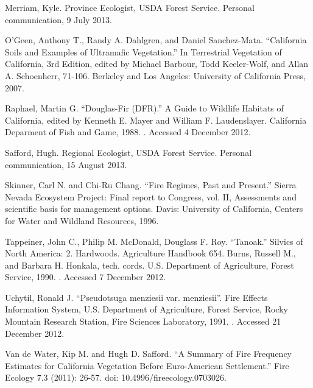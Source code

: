 \begin{hangparas}{.25in}{1}
Merriam, Kyle. Province Ecologist, USDA Forest Service. Personal communication, 9 July 2013.

O’Geen, Anthony T., Randy A. Dahlgren, and Daniel Sanchez-Mata. ``California Soils and Examples of Ultramafic Vegetation.'' In Terrestrial Vegetation of California, 3rd Edition, edited by Michael Barbour, Todd Keeler-Wolf, and Allan A. Schoenherr, 71-106. Berkeley and Los Angeles: University of California Press, 2007. 

Raphael, Martin G. ``Douglas-Fir (DFR).'' A Guide to Wildlife Habitats of California, edited by Kenneth E. Mayer and William F. Laudenslayer. California Deparment of Fish and Game, 1988. . Accessed 4 December 2012.

Safford, Hugh. Regional Ecologist, USDA Forest Service. Personal communication, 15 August 2013.

Skinner, Carl N. and Chi-Ru Chang. ``Fire Regimes, Past and Present.'' Sierra Nevada Ecosystem Project: Final report to Congress, vol. II, Assessments and scientific basis for management options. Davis: University of California, Centers for Water and Wildland Resources, 1996.

Tappeiner, John C., Philip M. McDonald, Douglass F. Roy. ``Tanoak.'' Silvics of North America: 2. Hardwoods. Agriculture Handbook 654. Burns, Russell M., and Barbara H. Honkala, tech. cords. U.S. Department of Agriculture, Forest Service, 1990. . Accessed 7 December 2012.

Uchytil, Ronald J. ``Pseudotsuga menziesii var. menziesii''.  Fire Effects Information System, U.S. Department of Agriculture, Forest Service,  Rocky Mountain Research Station, Fire Sciences Laboratory, 1991. . Accessed 21 December 2012.

Van de Water, Kip M. and Hugh D. Safford. ``A Summary of Fire Frequency Estimates for California Vegetation Before Euro-American Settlement.'' Fire Ecology 7.3 (2011): 26-57. doi: 10.4996/fireecology.0703026.
\end{hangparas}
